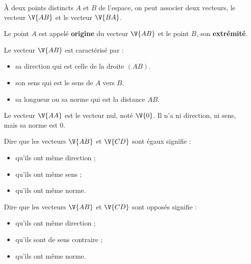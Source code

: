 \begin{definition}[s]
\par{} À deux points distincts $A$ et $B$ de l'espace, on peut associer deux vecteurs, le vecteur $\V{AB}$ et le vecteur $\V{BA}$.
\par {} Le point $A$ est appelé \textbf{origine} du vecteur $\V{AB}$ et le point $B$, son \textbf{extrémité}.
\par {} Le vecteur $\V{AB}$ est caractérisé par :
\begin{itemize}
	\item sa direction qui est celle de la droite $(AB)$.
	\item son sens qui est le sens de $A$ vers $B$.
	\item sa longueur ou sa norme qui est la distance $AB$.
\end{itemize}
\par {} Le vecteur $\V{AA}$ est le vecteur nul, noté $\V{0}$. Il n'a ni direction, ni sens, mais sa norme est $0$.
\par {} Dire que les vecteurs $\V{AB}$ et $\V{CD}$ sont égaux signifie :
\begin{itemize}
	\item qu'ils ont même direction ;
	\item qu'ils ont même sens ;
	\item qu'ils ont même norme.
\end{itemize}
\par {} Dire que les vecteurs $\V{AB}$ et $\V{CD}$ sont opposés signifie :
\begin{itemize}
	\item qu'ils ont même direction ;
	\item qu'ils sont de sens contraire ;
	\item qu'ils ont même norme.
\end{itemize}
\end{definition}\\
